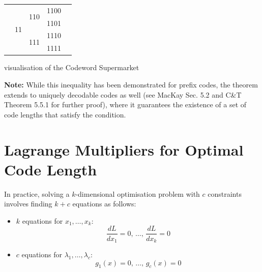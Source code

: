\begin{marginfigure}[30pt]
\begin{tabular}{|c|c|c|c|l|}
        \cline{2-4}
                           & \multirow{4}{*}{11} & \multirow{2}{*}{110} & 1100 &                                                                \\
        \cline{4-4}
                           &                     &                      & 1101 &                                                                \\
        \cline{3-4}
                           &                     & \multirow{2}{*}{111} & 1110 &                                                                \\
        \cline{4-4}
                           &                     &                      & 1111 &                                                                \\
        \hline
    \end{tabular}

    \caption{visualisation of the Codeword Supermarket}
\end{marginfigure}

\bigskip

\textbf{Note:} While this inequality has been demonstrated for prefix codes, the theorem extends to uniquely decodable codes as well (see MacKay Sec. 5.2 and C\&T Theorem 5.5.1 for further proof), where it guarantees the existence of a set of code lengths that satisfy the condition.

\section{Lagrange Multipliers for Optimal Code Length}


In practice, solving a \( k \)-dimensional optimisation problem with \( c \) constraints involves finding \( k + c \) equations as follows:
\begin{itemize}
    \item \( k \) equations for \( x_1, \ldots, x_k \):
          \[
              \frac{dL}{dx_1} = 0, \, \ldots, \, \frac{dL}{dx_k} = 0
          \]
    \item \( c \) equations for \(\lambda_1, \ldots, \lambda_c\):
          \[
              g_1(x) = 0, \, \ldots, \, g_c(x) = 0
          \]
\end{itemize}

